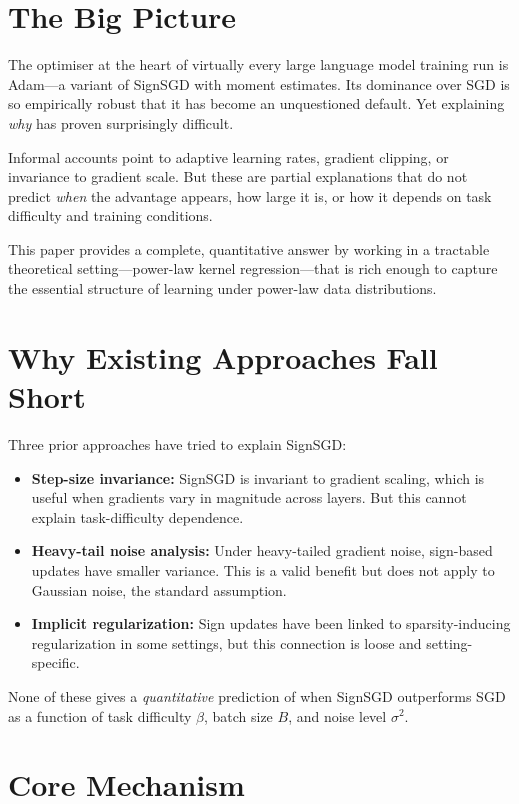 \documentclass[10pt,twocolumn]{article}
\begin{document}
\section{The Big Picture}

The optimiser at the heart of virtually every large language model training run is Adam---a variant of SignSGD with moment estimates.
Its dominance over SGD is so empirically robust that it has become an unquestioned default.
Yet explaining \emph{why} has proven surprisingly difficult.

Informal accounts point to adaptive learning rates, gradient clipping, or invariance to gradient scale.
But these are partial explanations that do not predict \emph{when} the advantage appears, how large it is, or how it depends on task difficulty and training conditions.

This paper provides a complete, quantitative answer by working in a tractable theoretical setting---power-law kernel regression---that is rich enough to capture the essential structure of learning under power-law data distributions.

\section{Why Existing Approaches Fall Short}

Three prior approaches have tried to explain SignSGD:

\begin{itemize}[leftmargin=1em,itemsep=2pt]
  \item \textbf{Step-size invariance:} SignSGD is invariant to gradient scaling, which is useful when gradients vary in magnitude across layers.
    But this cannot explain task-difficulty dependence.
  \item \textbf{Heavy-tail noise analysis:} Under heavy-tailed gradient noise, sign-based updates have smaller variance.
    This is a valid benefit but does not apply to Gaussian noise, the standard assumption.
  \item \textbf{Implicit regularization:} Sign updates have been linked to sparsity-inducing regularization in some settings, but this connection is loose and setting-specific.
\end{itemize}

None of these gives a \emph{quantitative} prediction of when SignSGD outperforms SGD as a function of task difficulty $\beta$, batch size $B$, and noise level $\sigma^2$.

\section{Core Mechanism}
\end{document}
